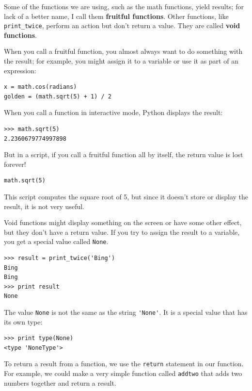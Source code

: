 \documentclass[10pt]{book}
\begin{document}
Some of the functions we are using, such as the math functions, yield
results; for lack of a better name, I call them {\bf fruitful
  functions}.  Other functions, like \verb"print_twice", perform an
action but don't return a value.  They are called {\bf void
  functions}.

When you call a fruitful function, you almost always
want to do something with the result; for example, you might
assign it to a variable or use it as part of an expression:

\beforeverb
\begin{verbatim}
x = math.cos(radians)
golden = (math.sqrt(5) + 1) / 2
\end{verbatim}
\afterverb
%
When you call a function in interactive mode, Python displays
the result:

\beforeverb
\begin{verbatim}
>>> math.sqrt(5)
2.2360679774997898
\end{verbatim}
\afterverb
%
But in a script, if you call a fruitful function all by itself,
the return value is lost forever!

\beforeverb
\begin{verbatim}
math.sqrt(5)
\end{verbatim}
\afterverb
%
This script computes the square root of 5, but since it doesn't store
or display the result, it is not very useful.


Void functions might display something on the screen or have some
other effect, but they don't have a return value.  If you try to
assign the result to a variable, you get a special value called
{\tt None}.


\beforeverb
\begin{verbatim}
>>> result = print_twice('Bing')
Bing
Bing
>>> print result
None
\end{verbatim}
\afterverb
%
The value {\tt None} is not the same as the string \verb"'None'". 
It is a special value that has its own type:

\beforeverb
\begin{verbatim}
>>> print type(None)
<type 'NoneType'>
\end{verbatim}
\afterverb
%
To return a result from a function, we use the {\tt return} statement 
in our function.  For example, we could make a very 
simple function called {\tt addtwo}
that adds two numbers together and return a result.
\end{document}
